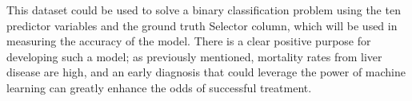 \documentclass[12pt]{report}
\begin{document}
This dataset could be used to solve a binary classification problem using the ten predictor 
variables and the ground truth Selector column, which will be used in measuring the accuracy of the model. There is a clear 
positive purpose for developing such a model; as previously mentioned, mortality rates from liver disease are high, and an early
diagnosis that could leverage the power of machine learning can greatly enhance the odds of successful treatment.


\end{document}
